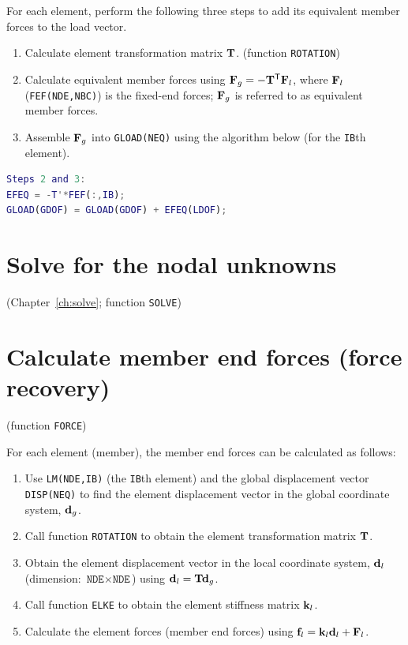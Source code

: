 For each element, perform the following three steps to add its equivalent member forces to the load vector.
\begin{enumerate}
  \item Calculate element transformation matrix $\mathbf{T}$. (function \texttt{ROTATION})
  \item Calculate equivalent member forces using $\mathbf{F}_g = -\mathbf{T}^{\mathsf{T}}\mathbf{F}_l$, where $\mathbf{F}_l$ (\texttt{FEF(NDE,NBC)}) is the fixed-end forces; $\mathbf{F}_g$ is referred to as equivalent member forces.
    \begin{fig}
      
    \end{fig}
  \item Assemble $\mathbf{F}_g$ into \texttt{GLOAD(NEQ)} using the algorithm below (for the \texttt{IB}th element).
\end{enumerate}
\begin{lstlisting}[language=Matlab,numbers=none]
Steps 2 and 3:
EFEQ = -T'*FEF(:,IB);
GLOAD(GDOF) = GLOAD(GDOF) + EFEQ(LDOF);
\end{lstlisting}

\section{Solve for the nodal unknowns}
(Chapter~\ref{ch:solve}; function \texttt{SOLVE})

\section{Calculate member end forces (force recovery)}
(function \texttt{FORCE})

For each element (member), the member end forces can be calculated as follows:
\begin{enumerate}
  \item Use \texttt{LM(NDE,IB)} (the \texttt{IB}th element) and the global displacement vector \texttt{DISP(NEQ)} to find the element displacement vector in the global coordinate system, $\mathbf{d}_g$.
  \item Call function \texttt{ROTATION} to obtain the element transformation matrix $\mathbf{T}$.
  \item Obtain the element displacement vector in the local coordinate system, $\mathbf{d}_l$ (dimension: $\texttt{NDE}\times\texttt{NDE}$) using $\mathbf{d}_l = \mathbf{T}\mathbf{d}_g$.
  \item Call function \texttt{ELKE} to obtain the element stiffness matrix $\mathbf{k}_l$.
  \item Calculate the element forces (member end forces) using $\mathbf{f}_l = \mathbf{k}_l\mathbf{d}_l + \mathbf{F}_l$.
\end{enumerate}

